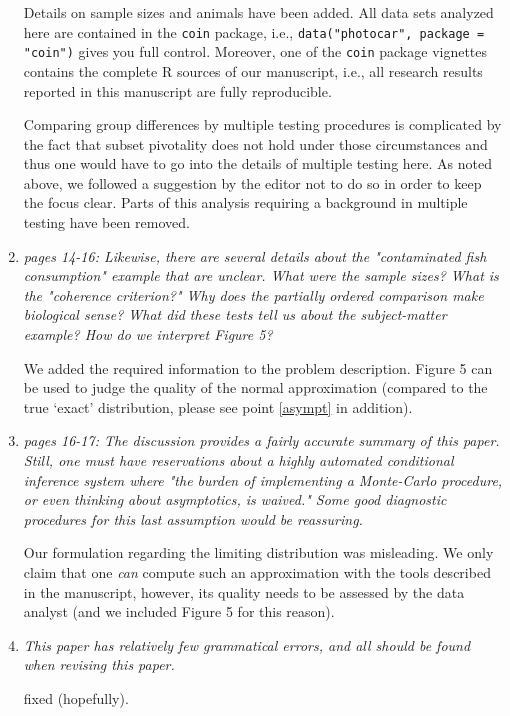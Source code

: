 \documentclass[11pt]{article}
\begin{document}
\begin{enumerate}
Details on sample sizes and animals have been added. All data sets analyzed
here are contained in the \texttt{coin} package, i.e., \texttt{data("photocar", package =
"coin")} gives you full control. Moreover, one of the \texttt{coin} package
vignettes contains the complete \textsf{R} sources of our manuscript, i.e.,
all research results reported in this manuscript are fully reproducible.

Comparing group differences by multiple testing procedures is complicated by
the fact that subset pivotality does not hold under those circumstances and
thus one would have to go into the details of multiple testing here. As
noted above, we followed a suggestion by the editor not to do so in order to
keep the focus clear. Parts of this analysis requiring a background in
multiple testing have been removed.

\item \textsl{pages 14-16:  Likewise, there are several details about the "contaminated fish 
              consumption" example that are unclear. What were the sample sizes? What is the 
              "coherence criterion?" Why does the partially ordered comparison make biological 
              sense? What did these tests tell us about the subject-matter example? How do we 
              interpret Figure 5? }

We added the required information to the problem description. Figure 5 can
be used to judge the quality of the normal approximation (compared to the
true `exact' distribution, please see point \ref{asympt} in addition).
 
\item \textsl{pages 16-17:  The discussion provides a fairly accurate summary of this paper. 
              Still, one must have reservations about a highly automated conditional inference 
              system where "the burden of implementing a Monte-Carlo procedure, or even thinking 
              about asymptotics, is waived." Some good diagnostic procedures for this last 
              assumption would be reassuring. }
 
Our formulation regarding the limiting distribution was misleading.
We only claim that one \textit{can} compute such an approximation with the
tools described in the manuscript, however, its quality needs to be
assessed by the data analyst (and we included Figure 5 for this reason).

\item \textsl{This paper has relatively few grammatical errors, and all should be found when 
              revising this paper.}

fixed (hopefully).

\end{enumerate}



\end{document}

